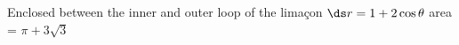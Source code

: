 {Enclosed between the inner and  outer loop of the lima\c con $\ds r=1+2\cos\theta$}
{area = $\pi+3\sqrt{3}$
}
